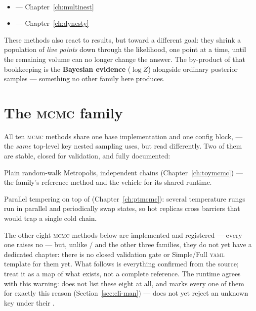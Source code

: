 \begin{description}[style=nextline, leftmargin=1.2em]
  \item[Nested sampling methods] \mbox{}\\[-0.4\baselineskip]
        \begin{itemize}
          \item {} --- Chapter~\ref{ch:multinest}
          \item {} --- Chapter~\ref{ch:dynesty}
        \end{itemize}
        These methods also react to results, but toward a different goal: they shrink a
        population of \emph{live
        points} down through the likelihood, one point at a time, until the remaining
        volume can no longer change the answer. The by-product of that bookkeeping is
        the \textbf{Bayesian evidence} ($\log Z$) alongside ordinary posterior samples
        --- something no other family here produces.
\end{description}

\section{The \textsc{mcmc} family}
\label{sec:mcmc-family}

All ten \textsc{mcmc} methods share one base implementation and one config block,
 --- the \emph{same} top-level key nested sampling uses, but
read differently. Two of them are stable, closed for validation, and fully
documented:

\begin{description}[style=nextline, leftmargin=1.2em]
  \item[\sampler{ToyMCMC}] Plain random-walk Metropolis, independent chains
        (Chapter~\ref{ch:toymcmc}) --- the family's reference method and the vehicle
        for its shared runtime.
  \item[\sampler{PTMCMC}] Parallel tempering on top of 
        (Chapter~\ref{ch:ptmcmc}): several temperature rungs run in parallel and
        periodically swap states, so hot replicas cross barriers that would trap a
        single cold chain.
\end{description}

\begin{jwarn}
The other eight \textsc{mcmc} methods below are implemented and registered --- every
one raises no  --- but, unlike  /
 and the other three families, they do not yet have a dedicated
chapter: there is no closed  validation gate or Simple/Full
\textsc{yaml} template for them yet. What follows is everything confirmed from the
source; treat it as a map of what exists, not a complete reference. The runtime
agrees with this warning:  does not list these eight at all,
and  marks every one of them 
for exactly this reason (Section~\ref{sec:cli-man}) ---  does
not yet reject an unknown key under their .
\end{jwarn}

